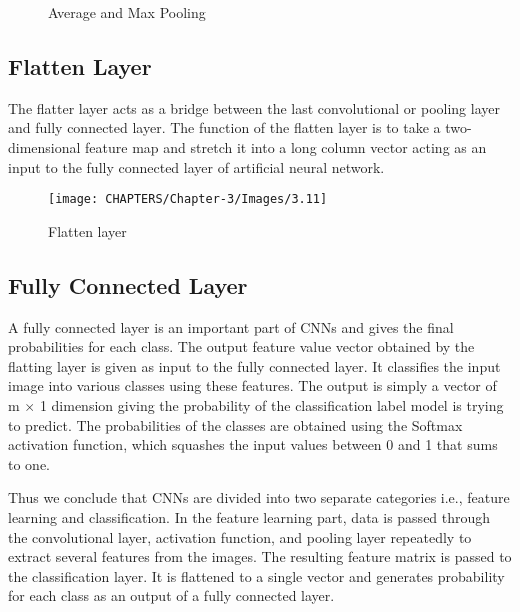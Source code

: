 \begin{figure}%
    \centering
    \qquad
    \caption{Average and Max Pooling}%
    \label{fig:3.10}%
\end{figure}

\subsection{Flatten Layer}

The flatter layer acts as a bridge between the last convolutional or pooling layer and fully connected layer. The function of the flatten layer is to take
a two-dimensional feature map and stretch it into a long column vector acting as an input to the fully connected layer of artificial neural network.


\begin{figure}[H]
    \centering
        \texttt{[image: CHAPTERS/Chapter-3/Images/3.11]}
    \caption{Flatten layer}
    \label{fig:3.11}
\end{figure}


\subsection{Fully Connected Layer} 

A fully connected layer is an important part of CNNs and gives the final probabilities for each class.  The output feature value vector obtained by the flatting layer is given as input to the fully connected layer. It classifies the input image into various classes using these features. The output is simply a vector of m $\times$ 1 dimension giving the probability of the classification label model is trying to predict. The probabilities of the
classes are obtained using the Softmax activation function, which squashes the input values between 0 and 1 that sums to one.

Thus we conclude that CNNs are divided into two separate categories i.e., feature learning and classification. In the feature learning part,
 data is passed through the convolutional layer, activation function, and pooling layer repeatedly to extract several features from the images. The resulting feature matrix is passed to the classification
layer. It is flattened to a single vector and generates probability for each class as an output of a fully connected layer.